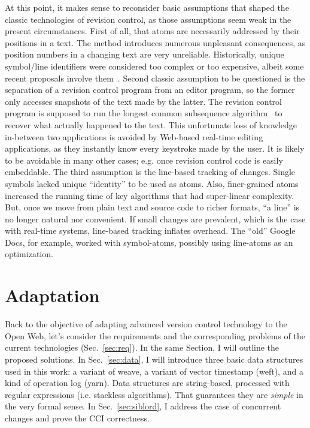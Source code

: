 \documentclass{sig-alternate}
\begin{document}
At this point, it makes sense to reconsider basic assumptions that shaped the classic technologies of revision control, as those assumptions seem weak in the present circumstances. 
First of all, that atoms are necessarily addressed by their positions in a text.
The method introduces numerous unpleasant consequences, as position numbers in a changing text are very unreliable. 
Historically, unique symbol/line identifiers were considered too complex or too expensive, albeit some recent proposals involve them~\cite{woot,logoot}.
Second classic assumption to be questioned is the separation of a revision control program from an editor program, so the former only accesses snapshots of the text made by the latter.
The revision control program is supposed to run the longest common subsequence algorithm~\cite{lcs-algo} to recover what actually happened to the text.
This unfortunate loss of knowledge in-between two applications is avoided by Web-based real-time editing applications, as they instantly know every keystroke made by the user.
It is likely to be avoidable in many other cases; e.g. once revision control code is easily embeddable.
The third assumption is the line-based tracking of changes. Single symbols lacked unique ``identity'' to be used as atoms. Also, finer-grained atoms increased the running time of key algorithms  that had super-linear complexity.
But, once we move from plain text and source code to richer formats, ``a line'' is no longer natural nor convenient.
If small changes are prevalent, which is the case with real-time systems, line-based tracking inflates overhead.
The ``old'' Google Docs, for example, worked with symbol-atoms, possibly using line-atoms as an optimization.


\section {Adaptation}   \label{sec:textile}

Back to the objective of adapting advanced version control technology to the Open Web, let's consider the requirements and the corresponding problems of the current technologies (Sec.~\ref{sec:req}). 
In the same Section, I will outline the proposed solutions.
In Sec.~\ref{sec:data}, I will introduce three basic data structures used in this work: a variant of weave, a variant of vector timestamp (weft), and a kind of operation log (yarn). Data structures are string-based, processed with regular expressions (i.e. stackless algorithms). That guarantees they are \emph{simple} in the very formal sense.
In Sec.~\ref{sec:siblord}, I address the case of concurrent changes and prove the CCI correctness.
\end{document}
